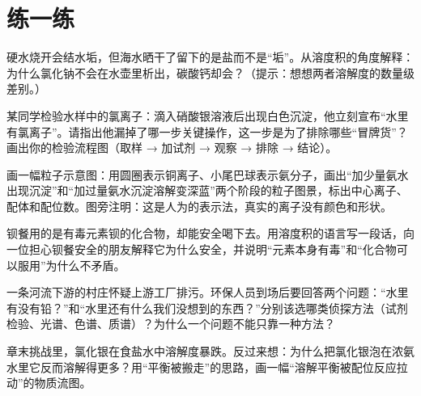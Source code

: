 \section*{练一练}

\begin{sikaoti}
\item 硬水烧开会结水垢，但海水晒干了留下的是盐而不是“垢”。从溶度积的角度解释：为什么氯化钠不会在水壶里析出，碳酸钙却会？（提示：想想两者溶解度的数量级差别。）
\item 某同学检验水样中的氯离子：滴入硝酸银溶液后出现白色沉淀，他立刻宣布“水里有氯离子”。请指出他漏掉了哪一步关键操作，这一步是为了排除哪些“冒牌货”？画出你的检验流程图（取样 → 加试剂 → 观察 → 排除 → 结论）。
\item 画一幅粒子示意图：用圆圈表示铜离子、小尾巴球表示氨分子，画出“加少量氨水出现沉淀”和“加过量氨水沉淀溶解变深蓝”两个阶段的粒子图景，标出中心离子、配体和配位数。图旁注明：这是人为的表示法，真实的离子没有颜色和形状。
\item 钡餐用的是有毒元素钡的化合物，却能安全喝下去。用溶度积的语言写一段话，向一位担心钡餐安全的朋友解释它为什么安全，并说明“元素本身有毒”和“化合物可以服用”为什么不矛盾。
\item 一条河流下游的村庄怀疑上游工厂排污。环保人员到场后要回答两个问题：“水里有没有铅？”和“水里还有什么我们没想到的东西？”分别该选哪类侦探方法（试剂检验、光谱、色谱、质谱）？为什么一个问题不能只靠一种方法？
\item 章末挑战里，氯化银在食盐水中溶解度暴跌。反过来想：为什么把氯化银泡在浓氨水里它反而溶解得更多？用“平衡被搬走”的思路，画一幅“溶解平衡被配位反应拉动”的物质流图。
\end{sikaoti}
